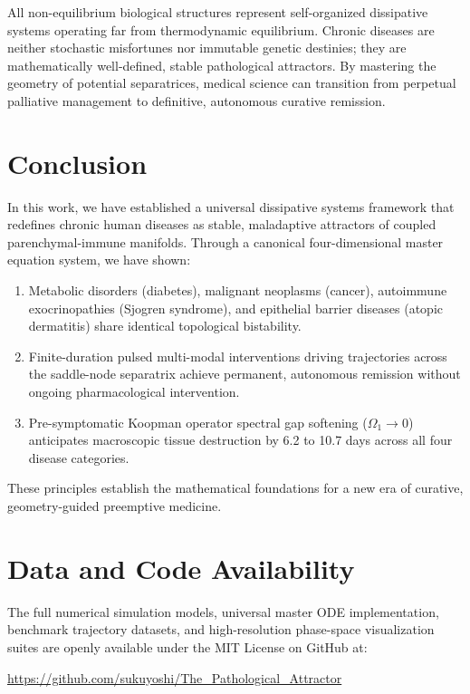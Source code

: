 \documentclass[11pt,a4paper]{article}
\begin{document}
All non-equilibrium biological structures represent self-organized dissipative systems operating far from thermodynamic equilibrium. Chronic diseases are neither stochastic misfortunes nor immutable genetic destinies; they are mathematically well-defined, stable pathological attractors. By mastering the geometry of potential separatrices, medical science can transition from perpetual palliative management to definitive, autonomous curative remission.

\section{Conclusion}

In this work, we have established a universal dissipative systems framework that redefines chronic human diseases as stable, maladaptive attractors of coupled parenchymal-immune manifolds. Through a canonical four-dimensional master equation system, we have shown:
\begin{enumerate}
    \item Metabolic disorders (diabetes), malignant neoplasms (cancer), autoimmune exocrinopathies (Sjogren syndrome), and epithelial barrier diseases (atopic dermatitis) share identical topological bistability.
    \item Finite-duration pulsed multi-modal interventions driving trajectories across the saddle-node separatrix achieve permanent, autonomous remission without ongoing pharmacological intervention.
    \item Pre-symptomatic Koopman operator spectral gap softening ($\Omega_1 \to 0$) anticipates macroscopic tissue destruction by 6.2 to 10.7 days across all four disease categories.
\end{enumerate}

These principles establish the mathematical foundations for a new era of curative, geometry-guided preemptive medicine.

\section*{Data and Code Availability}
The full numerical simulation models, universal master ODE implementation, benchmark trajectory datasets, and high-resolution phase-space visualization suites are openly available under the MIT License on GitHub at:
\begin{center}
\url{https://github.com/sukuyoshi/The_Pathological_Attractor}
\end{center}
\end{document}
